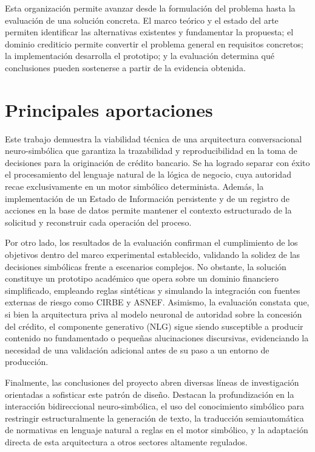 \documentclass[12pt,a4paper]{report}
\begin{document}
Esta organización permite avanzar desde la formulación del problema hasta la evaluación de una solución concreta. El marco teórico y el estado del arte permiten identificar las alternativas existentes y fundamentar la propuesta; el dominio crediticio permite convertir el problema general en requisitos concretos; la implementación desarrolla el prototipo; y la evaluación determina qué conclusiones pueden sostenerse a partir de la evidencia obtenida.

\section{Principales aportaciones}

Este trabajo demuestra la viabilidad técnica de una arquitectura conversacional neuro-simbólica que garantiza la trazabilidad y reproducibilidad en la toma de decisiones para la originación de crédito bancario. Se ha logrado separar con éxito el procesamiento del lenguaje natural de la lógica de negocio, cuya autoridad recae exclusivamente en un motor simbólico determinista. Además, la implementación de un Estado de Información persistente y de un registro de acciones en la base de datos permite mantener el contexto estructurado de la solicitud y reconstruir cada operación del proceso.

Por otro lado, los resultados de la evaluación confirman el cumplimiento de los objetivos dentro del marco experimental establecido, validando la solidez de las decisiones simbólicas frente a escenarios complejos. No obstante, la solución constituye un prototipo académico que opera sobre un dominio financiero simplificado, empleando reglas sintéticas y simulando la integración con fuentes externas de riesgo como CIRBE y ASNEF. Asimismo, la evaluación constata que, si bien la arquitectura priva al modelo neuronal de autoridad sobre la concesión del crédito, el componente generativo (NLG) sigue siendo susceptible a producir contenido no fundamentado o pequeñas alucinaciones discursivas, evidenciando la necesidad de una validación adicional antes de su paso a un entorno de producción.

Finalmente, las conclusiones del proyecto abren diversas líneas de investigación orientadas a sofisticar este patrón de diseño. Destacan la profundización en la interacción bidireccional neuro-simbólica, el uso del conocimiento simbólico para restringir estructuralmente la generación de texto, la traducción semiautomática de normativas en lenguaje natural a reglas en el motor simbólico, y la adaptación directa de esta arquitectura a otros sectores altamente regulados.
\end{document}
